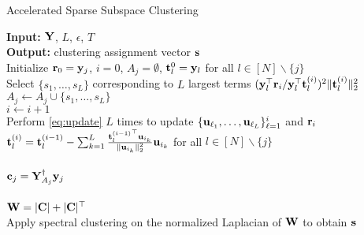 \begin{algorithm}[t]
\caption{Accelerated Sparse Subspace Clustering}
\label{alg:greedy}
\begin{algorithmic}[1]
\STATE \textbf{Input:} ${\mathbf Y}$, $L$, $\epsilon$, $T$\\
\STATE \textbf{Output:} clustering assignment vector ${\mathbf s}$\\
\STATE Initialize ${\mathbf r}_0 = {\mathbf y}_j$, $i=0$, $A_j = \emptyset$, ${\mathbf t}_l^{0} = {\mathbf y}_l$ for all $l \in [N]\backslash \{j\}$\\
\STATE Select $\{{s_1},\dots,{s_L}\}$ corresponding to $L$ largest terms
$({\mathbf y}_l^\top {\mathbf r}_i\slash {\mathbf y}_l^\top {\mathbf t}_l^{(i)})^2\|{\mathbf t}_l^{(i)}\|_2^2$ \\
\STATE $A_j\leftarrow A_j \cup\{{s_1},\dots,{s_L}\}$\\
\STATE $i \leftarrow i+1$\\
\STATE Perform \ref{eq:update} $L$ times to update $\{{\mathbf u}_{\ell_1},\dots,{\mathbf u}_{\ell_L}\}_{\ell=1}^{i}$ and ${\mathbf r}_i$ \\
\STATE ${\mathbf t}_l^{(i)} ={\mathbf t}_l^{(i-1)} -   \sum_{k = 1}^{L}\frac{{{\mathbf t}_l^{(i-1)}}^\top{\mathbf u}_{i_k}}{\|{\mathbf u}_{i_k}\|_2^2}{\mathbf u}_{i_k}$ for all $l \in [N]\backslash \{j\}$\\
\ENDWHILE \\
\STATE ${\mathbf c}_j={\mathbf Y}_{A_j}^{\dagger}{\mathbf y}_j$\\
\ENDFOR\\
\STATE ${\mathbf W} = |{\mathbf C}|+|{\mathbf C}|^\top$\\
\STATE Apply spectral clustering on the normalized Laplacian of ${\mathbf W}$ to obtain ${\mathbf s}$\\
\end{algorithmic}
\end{algorithm}
\vspace{-0.2cm}
